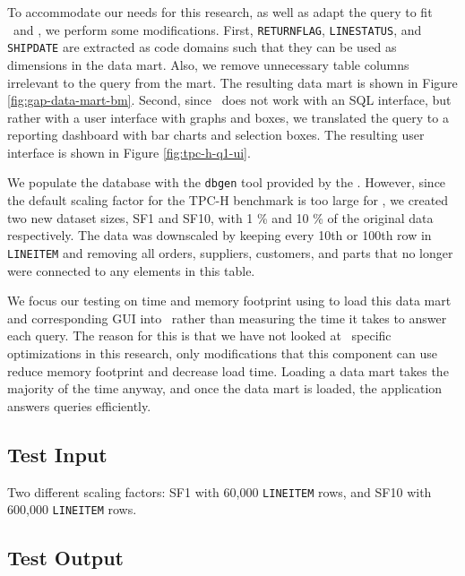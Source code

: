 

To accommodate our needs for this research, as well as adapt the query to fit \gap~and \gd, we perform some modifications. First, \texttt{RETURNFLAG}, \texttt{LINESTATUS}, and \texttt{SHIPDATE} are extracted as code domains such that they can be used as dimensions in the data mart. Also, we remove unnecessary table columns irrelevant to the query from the mart. The resulting data mart is shown in Figure \ref{fig:gap-data-mart-bm}. Second, since \gd~does not work with an SQL interface, but rather with a user interface with graphs and boxes, we translated the query to a reporting dashboard with bar charts and selection boxes. The resulting user interface is shown in Figure \ref{fig:tpc-h-q1-ui}. 

We populate the database with the \texttt{dbgen} tool provided by the . However, since the default scaling factor for the TPC-H benchmark is too large for \gap, we created two new dataset sizes, SF1 and SF10, with 1 \% and 10 \% of the original data respectively. The data was downscaled by keeping every 10th or 100th row in \texttt{LINEITEM} and removing all orders, suppliers, customers, and parts that no longer were connected to any elements in this table. 

We focus our testing on time and memory footprint using to load this data mart and corresponding GUI into \gd~rather than measuring the time it takes to answer each query. The reason for this is that we have not looked at \gd~specific optimizations in this research, only modifications that this component can use reduce memory footprint and decrease load time. Loading a data mart takes the majority of the time anyway, and once the data mart is loaded, the application answers queries efficiently.

\subsection{Test Input}
\label{sub:Test Input}

Two different scaling factors: SF1 with 60,000 \texttt{LINEITEM} rows, and SF10 with 600,000 \texttt{LINEITEM} rows.

\subsection{Test Output}
\label{sub:Test Output}

